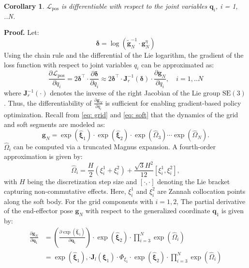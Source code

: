 \documentclass{article}
\newtheorem{corollary}[theorem]{Corollary}
\begin{document}
\begin{corollary} 
\label{cor:differentiable}
$\mathcal{L}_\text{pos}$ is differentiable with respect to the joint variables $\mathbf{q}_i$, i = 1, ..N.
\end{corollary}
\textbf{Proof.} 
Let:\[\boldsymbol{\delta} = \log\left( \tilde{\mathbf{g}}_N^{-1} \cdot \mathbf{g}^\eta_N \right)\]
Using the chain rule and the differential of the Lie logarithm, the gradient of the loss function with respect to joint variables $q_i$ can be approximated as:
\begin{equation}
\frac{\partial \mathcal{L}_{\text{pos}}}{\partial q_i} = 2 \boldsymbol{\delta}^\top \cdot \frac{\partial \boldsymbol{\delta}}{\partial q_i}  \approx 2 \boldsymbol{\delta}^\top \cdot \mathbf{J}_r^{-1}(\boldsymbol{\delta}) \cdot \frac{\partial \mathbf{g}_N}{\partial q_i}, \quad i = 1, ..N
\end{equation}
where $\mathbf{J}_r^{-1}(\cdot)$ denotes the inverse of the right Jacobian of the Lie group $\mathrm{SE}(3)$. Thus, the differentiability of $\frac{\partial \mathbf{g}_N}{\partial q_i}$ is sufficient for enabling gradient-based policy optimization. Recall from \cref{eq: grid} and \cref{eq: soft} that the dynamics of the grid and soft segments are modeled as:
\begin{equation}
\mathbf{g}_N = \exp(\hat{\boldsymbol{\xi}}_1) \cdot \exp(\hat{\boldsymbol{\xi}}_2) \cdot \exp(\widehat{\Omega}_3) \cdots \exp(\widehat{\Omega}_N).
\end{equation}
$\widehat{\Omega}_i$ can be computed via a truncated Magnus expansion. A fourth-order approximation is given by:
\begin{equation}
\widehat{\Omega}_i= \frac{H}{2}(\xi^1_i + \xi^2_i) + \frac{\sqrt{3} H^2}{12} [\xi^1_i, \xi^2_i],
\end{equation}
with $H$ being the discretization step size and $[\cdot,\cdot]$ denoting the Lie bracket capturing non-commutative effects. Here, $\xi^1_i$ and $\xi^2_i$ are  Zannah collocation points along the soft body. 
For the grid components with $i = 1, 2$, The partial derivative of the end-effector pose $\mathbf{g}_N$ with respect to the generalized coordinate $\boldsymbol{q}_1$ is given by:
\begin{equation}
\begin{aligned}
\frac{\partial \mathbf{g}_N}{\partial \boldsymbol{q}_1}
&= \left( \frac{\partial \exp(\hat{\boldsymbol{\xi}}_1)}{\partial \boldsymbol{q}_1} \right)
\cdot \exp(\hat{\boldsymbol{\xi}}_2)
\cdot \prod_{i=3}^{N} \exp(\widehat{\Omega}_i) \\
&= 
\exp(\hat{\boldsymbol{\xi}}_1), \cdot \mathbf{J}_l(\boldsymbol{\xi}_1) \cdot \Phi_{\xi_1} \cdot \exp(\hat{\boldsymbol{\xi}}_2) \cdot \prod_{i=3}^{N} \exp(\widehat{\Omega}_i)
\end{aligned}
\end{equation}
\end{document}
